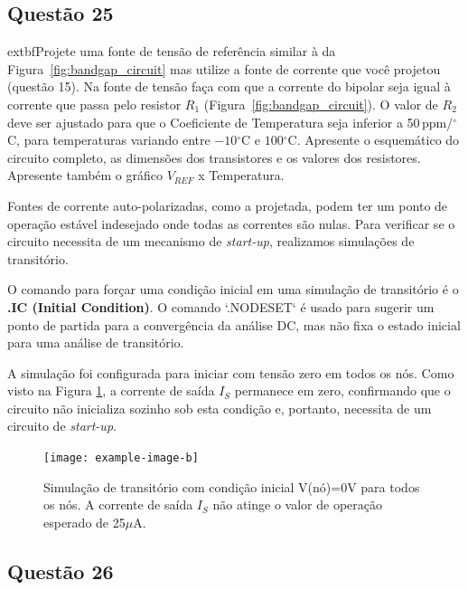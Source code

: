 ﻿\documentclass[12pt,a4paper]{article}
\newcommand{\degree}{\ensuremath{{}^\circ}}
\begin{document}
\subsection*{Questão 25}
\begin{BoxQ}
    extbf{Projete uma fonte de tensão de referência similar à da Figura~\ref{fig:bandgap_circuit} mas utilize a fonte de corrente que você projetou (questão 15). Na fonte de tensão faça com que a corrente do bipolar seja igual à corrente que passa pelo resistor $R_1$ (Figura~\ref{fig:bandgap_circuit}). O valor de $R_2$ deve ser ajustado para que o Coeficiente de Temperatura seja inferior a 50\,ppm/\degree C, para temperaturas variando entre $-10$\degree C e $100$\degree C. Apresente o esquemático do circuito completo, as dimensões dos transistores e os valores dos resistores. Apresente também o gráfico $V_{REF}$ x Temperatura.}
\end{BoxQ}

Fontes de corrente auto-polarizadas, como a projetada, podem ter um ponto de operação estável indesejado onde todas as correntes são nulas. Para verificar se o circuito necessita de um mecanismo de \textit{start-up}, realizamos simulações de transitório.

O comando para forçar uma condição inicial em uma simulação de transitório é o \textbf{.IC (Initial Condition)}. O comando `.NODESET` é usado para sugerir um ponto de partida para a convergência da análise DC, mas não fixa o estado inicial para uma análise de transitório.

A simulação foi configurada para iniciar com tensão zero em todos os nós. Como visto na Figura \ref{fig:startup_fail}, a corrente de saída $I_S$ permanece em zero, confirmando que o circuito não inicializa sozinho sob esta condição e, portanto, necessita de um circuito de \textit{start-up}.

\begin{figure}[H]
\centering
\texttt{[image: example-image-b]}
\caption{Simulação de transitório com condição inicial V(nó)=0V para todos os nós. A corrente de saída $I_S$ não atinge o valor de operação esperado de 25$\mu$A.}
\label{fig:startup_fail}
\end{figure}


\subsection*{Questão 26}
\end{document}
